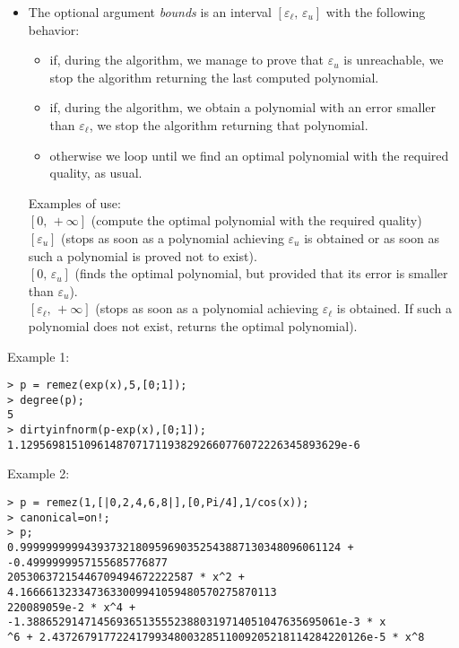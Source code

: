 \begin{itemize}
\item The optional argument \emph{bounds} is an interval $[\varepsilon_\ell,\,\varepsilon_u]$
   with the following behavior:\begin{itemize}
     \item if, during the algorithm, we manage to prove that $\varepsilon_u$ is
       unreachable, we stop the algorithm returning the last computed
       polynomial.
     \item if, during the algorithm, we obtain a polynomial with an error smaller
       than $\varepsilon_\ell$, we stop the algorithm returning that polynomial.
     \item otherwise we loop until we find an optimal polynomial with the required
       quality, as usual.\end{itemize}
   Examples of use:\\
     $[0,\,+\infty]$ (compute the optimal polynomial with the required quality)\\
     $[\varepsilon_u]$ (stops as soon as a polynomial achieving $\varepsilon_u$ is
                   obtained or as soon as such a polynomial is proved not to
                   exist).\\
     $[0,\,\varepsilon_u]$ (finds the optimal polynomial, but provided that its error
                      is smaller than $\varepsilon_u$).\\
     $[\varepsilon_\ell,\,+\infty]$ (stops as soon as a polynomial achieving
                             $\varepsilon_\ell$ is obtained. If such a polynomial
                             does not exist, returns the optimal polynomial).
\end{itemize}
\noindent Example 1: 
\begin{center}\begin{minipage}{15cm}\begin{Verbatim}[frame=single]
> p = remez(exp(x),5,[0;1]);
> degree(p);
5
> dirtyinfnorm(p-exp(x),[0;1]);
1.12956981510961487071711938292660776072226345893629e-6
\end{Verbatim}
\end{minipage}\end{center}
\noindent Example 2: 
\begin{center}\begin{minipage}{15cm}\begin{Verbatim}[frame=single]
> p = remez(1,[|0,2,4,6,8|],[0,Pi/4],1/cos(x));
> canonical=on!;
> p;
0.99999999994393732180959690352543887130348096061124 + -0.4999999957155685776877
20530637215446709494672222587 * x^2 + 4.1666613233473633009941059480570275870113
220089059e-2 * x^4 + -1.3886529147145693651355523880319714051047635695061e-3 * x
^6 + 2.4372679177224179934800328511009205218114284220126e-5 * x^8
\end{Verbatim}
\end{minipage}\end{center}
